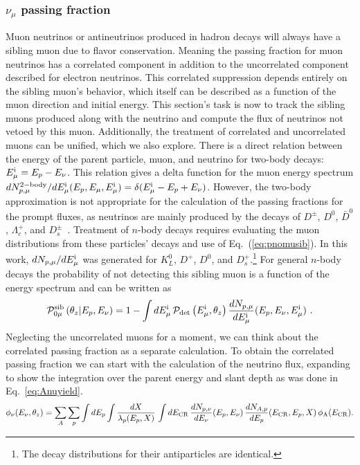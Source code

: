 \subsubsection{$\nu_\mu$ passing fraction}

Muon neutrinos or antineutrinos produced in hadron decays will always have a sibling muon due to flavor conservation.
Meaning the passing fraction for muon neutrinos has a correlated component in addition to the uncorrelated component described for electron neutrinos.
This correlated suppression depends entirely on the sibling muon's behavior, which itself can be described as a function of the muon direction and initial energy.
This section's task is now to track the sibling muons produced along with the neutrino and compute the flux of neutrinos not vetoed by this muon.
Additionally, the treatment of correlated and uncorrelated muons can be unified, which we also explore.
There is a direct relation between the energy of the parent particle, muon, and neutrino for two-body decays: $E_{\mu}^{\rm i} = E_p - E_\nu$.
This relation gives a delta function for the muon energy spectrum $dN_{p,\mu}^{\rm 2-body}/dE_{\mu}^{\rm i} (E_p,E_\mu,E_{\mu}^{\rm i})=\delta(E_{\mu}^{\rm i}-E_p+E_\nu)$.
However, the two-body approximation is not appropriate for the calculation of the passing fractions for the prompt fluxes, as neutrinos are mainly produced by the decays of $D^{\pm}$, $D^0$, $\bar{D}^0$, $\Lambda_c^+$, and $D_s^{\pm}$~\cite{Fedynitch:2015zma}.
Treatment of $n$-body decays requires evaluating the muon distributions from these particles' decays and use of Eq.~(\ref{eq:pnomusib}).
In this work, $dN_{p, \mu}/dE_{\mu}^{\rm i}$ was generated for $K^0_L$, $D^+$, $D^0$, and $D^+_s$.\footnote{The decay distributions for their antiparticles are identical.}
For general $n$-body decays the probability of not detecting this sibling muon is a function of the energy spectrum and can be written as
\begin{equation}
\label{eq:pnomusib}
{\mathcal P}_{0\mu}^{\rm sib} \left(\theta_z|E_p, E_\nu \right) = 1 - \int dE_{\mu}^{\rm i} \, {\mathcal P}_{\rm det}\left(E_{\mu}^{\rm i}, \theta_z\right) \frac{dN_{p, \mu}}{dE_{\mu}^{\rm i}}(E_p, E_\nu, E_{\mu}^{\rm i}) ~.
\end{equation}
Neglecting the uncorrelated muons for a moment, we can think about the correlated passing fraction as a separate calculation.
To obtain the correlated passing fraction we can start with the calculation of the neutrino flux, expanding to show the integration over the parent energy and slant depth as was done in Eq.~\ref{eq:Anuyield}.
\begin{equation}
\label{eq:nufluxcorexpanded}
\phi_\nu(E_\nu, \theta_z) = \sum_A \sum_{p} \int dE_p  \int \frac{dX}{\lambda_p(E_p, X)} \, \int dE_{\rm CR} \, \frac{dN_{p, \nu}}{dE_\nu}(E_p, E_\nu) \, \frac{dN_{A, p}}{dE_p}(E_{\rm CR}, E_p, X) \, \phi_{\rm A} (E_{\rm CR}).
\end{equation}
